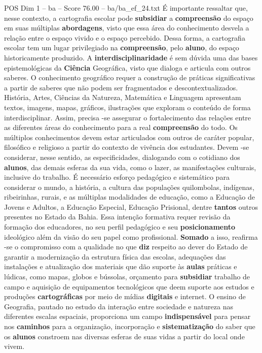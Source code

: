 \begin{textsample}{POS Dim 1 – ba – Score 76.00 – ba/ba\_ef\_24.txt}
É importante ressaltar que, nesse contexto, a cartografia escolar pode \textbf{subsidiar} a \textbf{compreensão} do espaço em suas múltiplas \textbf{abordagens}, visto que essa área do conhecimento desvela a relação entre o espaço vivido e o espaço percebido.
Dessa forma, a cartografia escolar tem um lugar privilegiado na \textbf{compreensão}, pelo \textbf{aluno}, do espaço historicamente produzido.
A \textbf{interdisciplinaridade} é sem dúvida uma das bases epistemológicas da \textbf{Ciência} Geográfica, visto que dialoga e articula com outros saberes.
O conhecimento geográfico requer a construção de práticas significativas a partir de saberes que não podem ser fragmentados e descontextualizados.
História, Artes, Ciências da Natureza, Matemática e Linguagem apresentam textos, imagens, mapas, gráficos, ilustrações que exploram o conteúdo de forma interdisciplinar.
Assim, precisa -se assegurar o fortalecimento das relações entre as diferentes áreas do conhecimento para a real \textbf{compreensão} do todo.
Os múltiplos conhecimentos devem estar articulados com outros de caráter popular, filosófico e religioso a partir do contexto de vivência dos estudantes.
Devem -se considerar, nesse sentido, as especificidades, dialogando com o cotidiano dos \textbf{alunos}, das demais esferas da sua vida, como o lazer, as manifestações culturais, inclusive do trabalho.
É necessário esforço pedagógico e sistemático para considerar o mundo, a história, a cultura das populações quilombolas, indígenas, ribeirinhas, rurais, e as múltiplas modalidades de educação, como a Educação de Jovens e Adultos, a Educação Especial, Educação Prisional, dentre \textbf{tantos} outros presentes no Estado da Bahia.
Essa intenção formativa requer revisão da formação dos educadores, no seu perfil pedagógico e seu \textbf{posicionamento} ideológico além da visão do seu papel como profissional. \textbf{Somado} a isso, reafirma -se o compromisso com a qualidade no que \textbf{diz} respeito ao dever do Estado de garantir a modernização da estrutura física das escolas, adequações das instalações e atualização dos materiais que dão suporte às \textbf{aulas} práticas e lúdicas, como mapas, globos e bússolas, orçamento para \textbf{subsidiar} trabalho de campo e aquisição de equipamentos tecnológicos que deem suporte aos estudos e produções \textbf{cartográficas} por meio de mídias \textbf{digitais} e internet.
O ensino de Geografia, pautado no estudo da interação entre sociedade e natureza nas diferentes escalas espaciais, proporciona um campo \textbf{indispensável} para pensar nos \textbf{caminhos} para a organização, incorporação e \textbf{sistematização} do saber que os \textbf{alunos} constroem nas diversas esferas de suas vidas a partir do local onde vivem.

\end{textsample}
